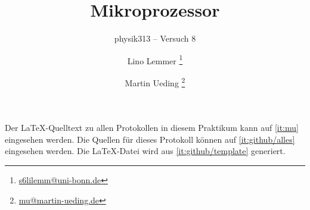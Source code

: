 


\usepackage{placeins}
\usepackage{minted}
\usepackage{multicol}


\subject{Praktikumsprotokoll}
\title{Mikroprozessor}
\subtitle{physik313 – Versuch 8}
\author{
	Lino Lemmer
    \footnote{\href{mailto:s6lilemm@uni-bonn.de}{s6lilemm@uni-bonn.de}}
	\and
	Martin Ueding
    \footnote{\href{mailto:mu@martin-ueding.de}{mu@martin-ueding.de}}
}


\newcommand\fT{f_\text{T}}
\newcommand\IB{I_\text{B}}
\newcommand\IC{I_\text{C}}
\newcommand\ID{I_\text{D}}
\newcommand\IE{I_\text{E}}
\newcommand\IS{I_\text{S}}
\newcommand\RC{R_\text{C}}
\newcommand\RD{R_\text{D}}
\newcommand\RE{R_\text{E}}
\newcommand\UBE{U_\text{BE}}
\newcommand\UB{U_\text{B}}
\newcommand\UCE{U_\text{CE}}
\newcommand\UC{U_\text{C}}
\newcommand\UD{U_\text{D}}
\newcommand\UDS{U_\text{DS}}
\newcommand\UE{U_\text{E}}
\newcommand\UGS{U_\text{GS}}
\newcommand\UG{U_\text{G}}
\newcommand\Uin{U_\text{in}}
\newcommand\Uout{U_\text{out}}

\newcommand\UEH{U_\text{E H}}
\newcommand\UEL{U_\text{E L}}
\newcommand\UH{U_\text{H}}
\newcommand\UL{U_\text{L}}
\newcommand\UQH{U_\text{Q H}}
\newcommand\UQL{U_\text{Q L}}

\newcommand\mand {\wedge}
\newcommand\mhigh{\top}
\newcommand\mlow {\bot}
\newcommand\mnand{\bar\wedge}
\newcommand\mnor {\bar\vee}
\newcommand\mnot {\neg}
\newcommand\mor  {\vee}
\newcommand\mxor {\veebar}
\newcommand\tand {\textsc{and}}
\newcommand\thigh{\textsc{high}}
\newcommand\tlow {\textsc{low}}
\newcommand\tnand{\textsc{nand}}
\newcommand\tnor {\textsc{nor}}
\newcommand\tnot {\textsc{not}}
\newcommand\tor  {\textsc{or}}
\newcommand\txor {\textsc{xor}}



\maketitle

\vfill

Der \LaTeX-Quelltext zu allen Protokollen in diesem Praktikum kann auf
\ref{it:mu} eingesehen werden. Die Quellen für dieses Protokoll können auf
\ref{it:github/alles} eingesehen werden. Die \LaTeX-Datei wird aus
\ref{it:github/template} generiert.

